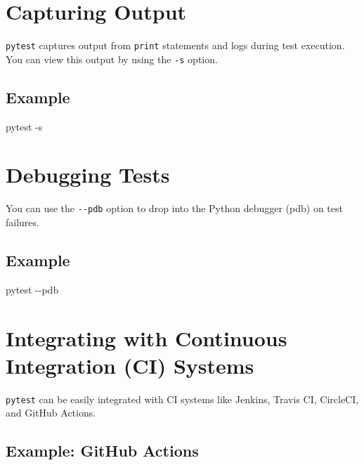 \documentclass[
  letterpaper,
  DIV=11,
  numbers=noendperiod]{scrreprt}
\newenvironment{Shaded}{\begin{snugshade}}{\end{snugshade}}
\newcommand{\AttributeTok}[1]{\textcolor[rgb]{0.40,0.45,0.13}{#1}}
\newcommand{\ExtensionTok}[1]{\textcolor[rgb]{0.00,0.23,0.31}{#1}}
\begin{document}
\section{Capturing Output}\label{capturing-output}

\texttt{pytest} captures output from \texttt{print} statements and logs
during test execution. You can view this output by using the \texttt{-s}
option.

\subsection{Example}\label{example-25}

\begin{Shaded}
\begin{Highlighting}[]
\ExtensionTok{pytest} \AttributeTok{{-}s}
\end{Highlighting}
\end{Shaded}

\section{Debugging Tests}\label{debugging-tests-1}

You can use the \texttt{-\/-pdb} option to drop into the Python debugger
(pdb) on test failures.

\subsection{Example}\label{example-26}

\begin{Shaded}
\begin{Highlighting}[]
\ExtensionTok{pytest} \AttributeTok{{-}{-}pdb}
\end{Highlighting}
\end{Shaded}

\section{Integrating with Continuous Integration (CI)
Systems}\label{integrating-with-continuous-integration-ci-systems}

\texttt{pytest} can be easily integrated with CI systems like Jenkins,
Travis CI, CircleCI, and GitHub Actions.

\subsection{Example: GitHub Actions}\label{example-github-actions}
\end{document}
